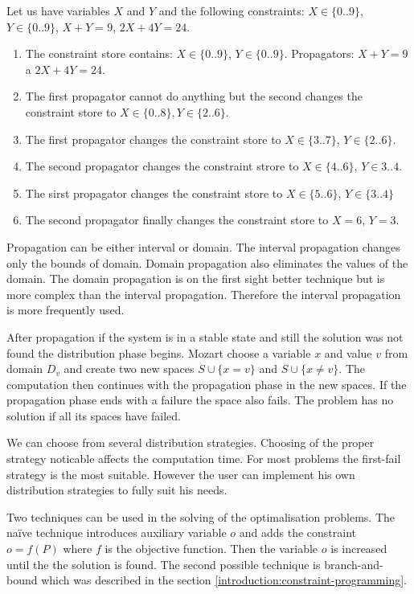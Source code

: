 \begin{example} Let us have variables $X$ and $Y$ and the following constraints: $X \in \{0..9\}$, $Y \in \{0..9\}$, 
  $X+Y = 9$, $2X + 4Y = 24$. 
\begin{enumerate}
  \item The constraint store contains: $X \in \{0..9\}$, $Y \in \{0..9\}$. Propagators: $X+Y = 9$ a $2X + 4Y = 24$.
  \item	The first propagator cannot do anything but the second changes the constraint store to $X \in \{0..8\}, Y \in \{2..6\}$.
  \item	The first propagator changes the constraint store to $X \in \{3..7\}$, $Y \in \{2..6\}$.
  \item	The second propagator changes the constraint strore to $X \in \{4..6\}$, $Y \in 3..4$.
  \item	The sirst propagator changes the constraint store to $X \in \{5..6\}$, $Y \in \{3..4\}$
  \item	The second propagator finally changes the constraint store to $X = 6$, $Y = 3$.
\end{enumerate}
\end{example}

Propagation can be either interval or domain. The interval propagation changes only 
the bounds of domain. Domain propagation also eliminates the values of the domain.
The domain propagation is on the first sight better technique but is more complex
than the interval propagation. Therefore the interval propagation is more frequently used.

After propagation if the system is in a stable state and still the solution was not found
the distribution phase begins. Mozart choose a variable $x$ and value $v$ from domain
 $D_v$ and create two new spaces $S \cup \{x = v\}$ and $S \cup \{x \neq v\}$.
 The computation then continues with the propagation phase in the new spaces.
 If the propagation phase ends with a failure the space also fails. The problem has no
 solution if all its spaces have failed.

We can choose from several distribution strategies. Choosing of the proper strategy 
noticable affects the computation time.  For most problems the first-fail strategy is
the most suitable. However the user can implement his own distribution strategies to fully
suit his needs.

Two techniques can be used in the solving of the optimalisation problems. The na\"{i}ve 
technique introduces auxiliary variable $o$ and adds the constraint $o = f(P)$ where $f$ is the
objective function. Then the variable $o$ is increased until the the solution is found. The second possible
technique is branch-and-bound which was described in the section \ref{introduction:constraint-programming}.

